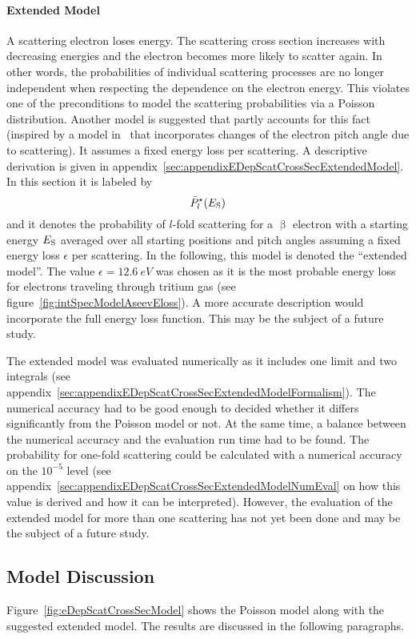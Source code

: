 \paragraph{Extended Model}
A scattering electron loses energy. The scattering cross section increases with decreasing energies and the electron becomes more likely to scatter again. In other words, the probabilities of individual scattering processes are no longer independent when respecting the dependence on the electron energy. This violates one of the preconditions to model the scattering probabilities via a Poisson distribution. Another model is suggested that partly accounts for this fact (inspired by a model in~\cite{Groh2015} that incorporates changes of the electron pitch angle due to scattering). It assumes a fixed energy loss per scattering. A descriptive derivation is given in appendix~\ref{sec:appendixEDepScatCrossSecExtendedModel}. In this section it is labeled by
\begin{equation}
	\label{eq:eDepScatCrossSecModelExtended}
	\bar{P}^{\star}_l(E_\mathrm{S})
\end{equation}
and it denotes the probability of $l$-fold scattering for a $\upbeta$ electron with a starting energy $E_\mathrm{S}$ averaged over all starting positions and pitch angles assuming a fixed energy loss $\epsilon$ per scattering. In the following, this model is denoted the ``extended model''. The value $\epsilon=\SI{12.6}{eV}$ was chosen as it is the most probable energy loss for electrons traveling through tritium gas (see figure~\ref{fig:intSpecModelAseevEloss}). A more accurate description would incorporate the full energy loss function. This may be the subject of a future study. 

The extended model was evaluated numerically as it includes one limit and two integrals (see appendix~\ref{sec:appendixEDepScatCrossSecExtendedModelFormalism}). The numerical accuracy had to be good enough to decided whether it differs significantly from the Poisson model or not. At the same time, a balance between the numerical accuracy and the evaluation run time had to be found. The probability for one-fold scattering could be calculated with a numerical accuracy on the $10^{-5}$ level (see appendix~\ref{sec:appendixEDepScatCrossSecExtendedModelNumEval} on how this value is derived and how it can be interpreted). However, the evaluation of the extended model for more than one scattering has not yet been done and may be the subject of a future study.

\subsection{Model Discussion}
\label{sec:eDepScatCrossSecModelDiscussion}
Figure~\ref{fig:eDepScatCrossSecModel} shows the Poisson model along with the suggested extended model. The results are discussed in the following paragraphs.


